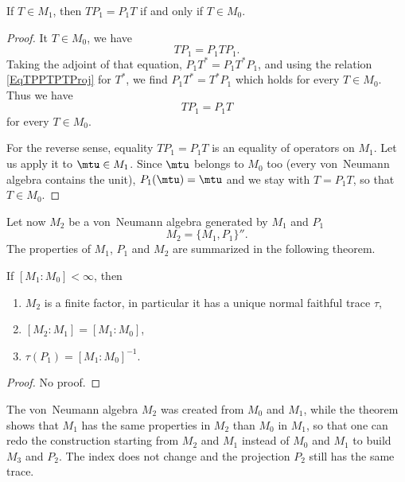 \begin{lemma}		\label{LemTMunPTTPiffTMzero}
If $T\in M_1$, then $TP_1=P_1T$ if and only if $T\in M_0$.
\end{lemma}

\begin{proof}
It $T\in M_0$, we have
\begin{equation}		\label{EqTPPTPTProj}
	TP_1=P_1TP_1.
\end{equation}
Taking the adjoint of that equation, $P_1T^*=P_1T^*P_1$, and using the relation \eqref{EqTPPTPTProj} for $T^*$, we find $P_1T^*=T^*P_1$ which holds for every $T\in M_0$. Thus we have
\begin{equation}
	TP_1=P_1T
\end{equation}
for every $T\in M_0$.

For the reverse sense, equality $TP_1=P_1T$ is an equality of operators on $M_1$. Let us apply it to $\mtu\in M_1$. Since $\mtu$ belongs to $M_0$ too (every von~Neumann algebra contains the unit), $P_1(\mtu)=\mtu$ and we stay with $T=P_1T$, so that $T\in M_0$. 
\end{proof}

Let now $M_2$ be a von~Neumann algebra generated by $M_1$ and $P_1$
\begin{equation}
	M_2=\{ M_1,P_1 \}''.
\end{equation}
The properties of $M_1$, $P_1$ and $M_2$ are summarized in the following theorem.
\begin{theorem}
	If $[M_1:M_0]<\infty$, then
\begin{enumerate}
\item $M_2$ is a finite factor, in particular it has a unique normal faithful trace $\tau$,
\item $[M_2:M_1]=[M_1:M_0]$,
\item $\tau(P_1)=[M_1:M_0]^{-1}$.
\end{enumerate}
\end{theorem}
\begin{proof}
No proof.
\end{proof}

The von~Neumann algebra $M_2$ was created from $M_0$ and $M_1$, while the theorem shows that $M_1$ has the same properties in $M_2$ than $M_0$ in $M_1$, so that one can redo the construction starting from $M_2$ and $M_1$ instead of $M_0$ and $M_1$ to build $M_3$ and $P_2$. The index does not change and the projection $P_2$ still has the same trace.

